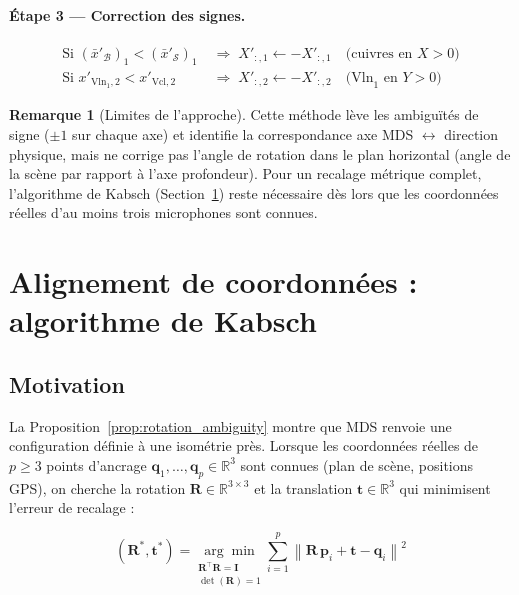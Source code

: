 \documentclass[12pt, a4paper]{article}
\theoremstyle{plain}
\theoremstyle{definition}
\newtheorem{remark}[theorem]{Remarque}
\newcommand{\R}{\mathbb{R}}
\newcommand{\norm}[1]{\left\lVert #1 \right\rVert}
\newcommand{\mat}[1]{\mathbf{#1}}
\newcommand{\vect}[1]{\mathbf{#1}}
\begin{document}
\paragraph{Étape 3 — Correction des signes.}

\begin{align}
    \text{Si } (\bar{x}'_{\mathcal{B}})_1 < (\bar{x}'_{\mathcal{S}})_1
    &\;\Longrightarrow\; X'_{:,1} \leftarrow -X'_{:,1}
    \quad\text{(cuivres en }X > 0\text{)} \label{eq:sign_depth}\\[4pt]
    \text{Si } x'_{\text{Vln}_1, 2} < x'_{\text{Vcl}, 2}
    &\;\Longrightarrow\; X'_{:,2} \leftarrow -X'_{:,2}
    \quad\text{(Vln}_1\text{ en }Y > 0\text{)} \label{eq:sign_lat}
\end{align}

\begin{remark}[Limites de l'approche]
    Cette méthode lève les ambiguïtés de signe ($\pm 1$ sur chaque axe) et
    identifie la correspondance axe MDS $\leftrightarrow$ direction physique,
    mais ne corrige pas l'angle de rotation dans le plan horizontal (angle de
    la scène par rapport à l'axe profondeur).  Pour un recalage métrique
    complet, l'algorithme de Kabsch (Section~\ref{sec:kabsch}) reste nécessaire
    dès lors que les coordonnées réelles d'au moins trois microphones sont
    connues.
\end{remark}

\section{Alignement de coordonnées : algorithme de Kabsch}
\label{sec:kabsch}

\subsection{Motivation}

La Proposition~\ref{prop:rotation_ambiguity} montre que MDS renvoie une
configuration définie à une isométrie près.  Lorsque les coordonnées réelles
de $p \geq 3$ points d'ancrage $\vect{q}_1, \ldots, \vect{q}_p \in \R^3$
sont connues (plan de scène, positions GPS), on cherche la rotation
$\mat{R} \in \R^{3\times3}$ et la translation $\vect{t} \in \R^3$ qui
minimisent l'erreur de recalage :

\begin{equation}
    (\mat{R}^*, \vect{t}^*) = \underset{\substack{\mat{R}^\top\mat{R}=\mat{I}\\\det(\mat{R})=1}}{\arg\min}
    \sum_{i=1}^p \norm{\mat{R}\,\vect{p}_i + \vect{t} - \vect{q}_i}^2
\end{equation}
\end{document}
